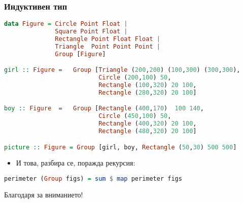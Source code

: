 \documentclass{beamer}
\begin{document}
\begin{frame}[fragile]
  \frametitle{Индуктивен тип}
\begin{lstlisting}[basicstyle=\tiny,language=Haskell]
data Figure = Circle Point Float | 
              Square Point Float |
              Rectangle Point Float Float |
              Triangle  Point Point Point |
              Group [Figure]

girl :: Figure =   Group [Triangle (200,200) (100,300) (300,300),
                          Circle (200,100) 50,
                          Rectangle (100,320) 20 100,
                          Rectangle (280,320) 20 100]

boy :: Figure  =   Group [Rectangle (400,170)  100 140, 
                          Circle (450,100) 50,
                          Rectangle (400,320) 20 100,
                          Rectangle (480,320) 20 100]

picture :: Figure = Group [girl, boy, Rectangle (50,30) 500 500]
\end{lstlisting}

\begin{itemize}
  \item И това, разбира се, поражда рекурсия:
\end{itemize}

\begin{lstlisting}[basicstyle=\small,language=Haskell]
perimeter (Group figs) = sum $ map perimeter figs
\end{lstlisting}


\end{frame}



\begin{frame}
  \centerline{Благодаря за вниманието!}
\end{frame}
\end{document}
